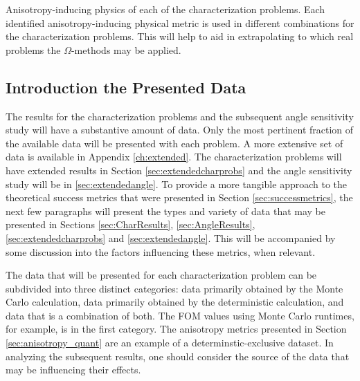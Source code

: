 \begin{table}[h!]
  \centering
  
  \caption[Anisotropy-inducing physics of each of the characterization problems.]
  {Anisotropy-inducing physics of each of the characterization problems.
  Each identified anisotropy-inducing physical metric is used in different
  combinations for the characterization problems. This will help to aid in
  extrapolating to which real problems the $\Omega$-methods may be applied.}
  \label{tab:probphysics}
\end{table}

\subsection{Introduction the Presented Data}
\label{subsec:resultsintro}

The results for the characterization problems and the subsequent angle
sensitivity study will have a substantive amount of data. Only the most
pertinent fraction of the available data will be presented with each problem.
A more extensive set of data is available in Appendix \ref{ch:extended}. The
characterization problems will have extended results in Section
\ref{sec:extendedcharprobs} and the angle sensitivity study will be in
\ref{sec:extendedangle}. To provide a more tangible approach to the theoretical success
metrics that were presented in Section \ref{sec:successmetrics}, the next few
paragraphs will present the types and variety of data that may be presented in
Sections \ref{sec:CharResults}, \ref{sec:AngleResults},
\ref{sec:extendedcharprobs} and \ref{sec:extendedangle}. This will be
accompanied by some discussion into the factors influencing these metrics, when
relevant.

The data that will be presented for each characterization problem
can be subdivided into three distinct
categories: data primarily obtained by the Monte Carlo calculation, data
primarily obtained by the deterministic calculation, and data that is a
combination of both. The FOM values using Monte Carlo runtimes, for example, is
in the first category. The anisotropy metrics presented in Section
\ref{sec:anisotropy_quant} are an example of a determinstic-exclusive dataset.
In analyzing the subsequent results, one should consider the source of the data
that may be influencing their effects.

